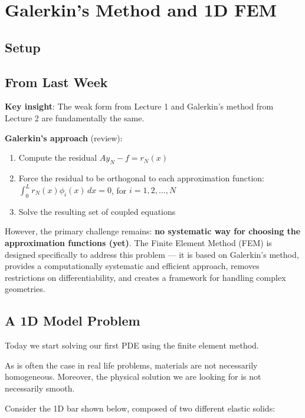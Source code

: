 \documentclass[
  11pt,
  a4paper,
]{scrbook}
\providecommand{\tightlist}{%
  \setlength{\itemsep}{0pt}\setlength{\parskip}{0pt}}\usepackage{longtable,booktabs,array}
\begin{document}
\chapter{Galerkin's Method and 1D
FEM}\label{galerkins-method-and-1d-fem}

\section{Setup}\label{setup-3}

\section{From Last Week}\label{from-last-week}

\textbf{Key insight}: The weak form from Lecture 1 and Galerkin's method
from Lecture 2 are fundamentally the same.

\textbf{Galerkin's approach} (review):

\begin{enumerate}
\def\labelenumi{\arabic{enumi}.}
\tightlist
\item
  Compute the residual \(Ay_N - f = r_N(x)\)
\item
  Force the residual to be orthogonal to each approximation function:
  \(\int_0^L r_N(x) \phi_i(x)\,dx = 0\), for \(i = 1, 2, \ldots, N\)
\item
  Solve the resulting set of coupled equations
\end{enumerate}

However, the primary challenge remains: \textbf{no systematic way for
choosing the approximation functions (yet)}. The Finite Element Method
(FEM) is designed specifically to address this problem --- it is based
on Galerkin's method, provides a computationally systematic and
efficient approach, removes restrictions on differentiability, and
creates a framework for handling complex geometries.

\section{A 1D Model Problem}\label{a-1d-model-problem}

Today we start solving our first PDE using the finite element method.

As is often the case in real life problems, materials are not
necessarily homogeneous. Moreover, the physical solution we are looking
for is not necessarily smooth.

Consider the 1D bar shown below, composed of two different elastic
solids:
\end{document}
